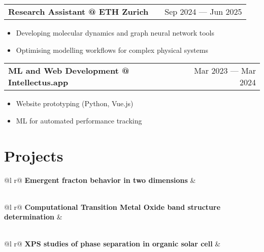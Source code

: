 \documentclass[a4paper,11pt]{article}
\makeatletter
\newenvironment{joblong}[2]
    {
    \begin{tabularx}{\linewidth}{@{}l X r@{}}
    \textbf{#1} & \hfill &  #2 \\[3.75pt]
    \end{tabularx}
    \begin{minipage}[t]{\linewidth}
    \begin{itemize}[nosep,after=\strut, leftmargin=1em, itemsep=3pt,label=--]
    }
    {
    \end{itemize}
    \end{minipage}    
    }
\makeatother
\begin{document}
\begin{joblong}{Research Assistant @ ETH Zurich}{Sep 2024 --- Jun 2025}
    \item Developing molecular dynamics and graph neural network tools
    \item Optimising modelling workflows for complex physical systems
\end{joblong}

\begin{joblong}{ML and Web Development @ Intellectus.app}{Mar 2023 --- Mar 2024}
    \item Website prototyping (Python, Vue.js)
    \item ML for automated performance tracking
\end{joblong}
  
\section{Projects}

\begin{tabularx}{\linewidth}{ @{}l r@{} }%
\textbf{Emergent fracton behavior in two dimensions} & \hfill \\[3.75pt]
  \\
\end{tabularx}

\begin{tabularx}{\linewidth}{ @{}l r@{} }%
\textbf{Computational Transition Metal Oxide band structure determination} & \hfill \\[3.75pt]
  \\
\end{tabularx}

\begin{tabularx}{\linewidth}{ @{}l r@{} }%
\textbf{XPS studies of phase separation in organic solar cell} & \hfill \\[3.75pt]
  \\
\end{tabularx}

\end{document}
